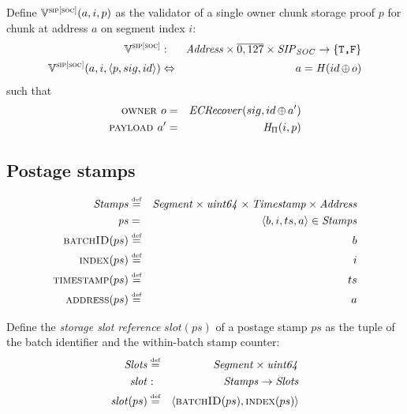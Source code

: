 \begin{definition}
\label{def:socproof-validity}
Define $\mathbb{V}^{\textsc{sip[soc]}}(a, i, p)$ as the validator of a single owner chunk storage proof $p$ for chunk at address $a$ on segment index $i$:
%
\begin{eqnarray}
\mathbb{V}^{\textsc{sip[soc]}}&:&\mathit{Address}\times\overline{0,127}\times\mathit{SIP}_\mathit{SOC}\to\{\texttt{T,F}\}\\ \mathbb{V}^{\textsc{sip[soc]}}(a, i, \langle p, sig, id\rangle)&
\Leftrightarrow&a= \mathit{H}(id\operatorname{\operatorname{\oplus}} o)
\end{eqnarray}
such that 
\begin{eqnarray}
\textsc{owner } o&=& \mathit{ECRecover}(sig,id\operatorname{\operatorname{\oplus}} a')\\
\textsc{payload } a'&=& \mathit{H}_{\Pi}(i,p)
\end{eqnarray}
\end{definition}



\subsection{Postage stamps}
\begin{definition}
\label{def:postage-stamp}
%
\begin{eqnarray}
\mathit{Stamps}&\overset{\textrm{\tiny def}}{=}& \mathit{Segment}\times\mathit{uint64}\times\mathit{Timestamp}\times\mathit{Address}\\
\mathit{ps} &=&\langle  b,i,ts,a\rangle\in \mathit{Stamps} 
\\
\textsc{batchID}(ps) &\overset{\textrm{\tiny def}}{=}& b 
\\
\textsc{index}(ps) &\overset{\textrm{\tiny def}}{=} &i 
\\
\textsc{timestamp}(ps)&\overset{\textrm{\tiny def}}{=} &ts 
\\
\textsc{address}(ps) &\overset{\textrm{\tiny def}}{=} &a 
\end{eqnarray}
\end{definition}


\begin{definition}
\label{def:slot}
Define the \emph{storage slot reference} $\mathit{slot}(ps)$ of a postage stamp $ps$ as the tuple of the batch identifier and the within-batch stamp counter:
%
\begin{eqnarray}
\mathit{Slots}&\overset{\textrm{\tiny def}}{=}&\mathit{Segment}\times\mathit{uint64}\\
\mathit{slot}&:& \mathit{Stamps}\to\mathit{Slots}\\
\mathit{slot}(ps) &\overset{\textrm{\tiny def}}{=} &\langle \textsc{batchID}(ps),\textsc{index}(ps)\rangle 
\end{eqnarray}
%
\end{definition}


